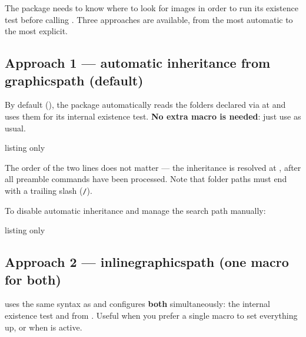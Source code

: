 \documentclass[11pt,a4paper]{ltxdoc}
\begin{document}
The package needs to know where to look for images in order to run its existence test before calling . Three approaches are available, from the most automatic to the most explicit.

\subsection{Approach 1 --- automatic inheritance from graphicspath (default)}

By default (), the package automatically reads the folders declared via \ShowCode{\\graphicspath} at  and uses them for its internal existence test. \textbf{No extra macro is needed}: just use \ShowCode{\\graphicspath} as usual.

\begin{DemoCode}{listing only}
\usepackage{inlinegraphicx}
\graphicspath{{images/}{figures/}}   %
\end{DemoCode}

The order of the two lines does not matter --- the inheritance is resolved at , after all preamble commands have been processed. Note that folder paths must end with a trailing slash (\texttt{/}).

\smallskip

To disable automatic inheritance and manage the search path manually:

\begin{DemoCode}{listing only}
\usepackage[inherit=false]{inlinegraphicx}
\end{DemoCode}

\subsection{Approach 2 --- inlinegraphicspath (one macro for both)}

\ShowCode{\\inlinegraphicspath} uses the same syntax as \ShowCode{\\graphicspath} and configures \textbf{both} simultaneously: the internal existence test and \ShowCode{\\graphicspath} from . Useful when you prefer a single macro to set everything up, or when  is active.
\end{document}
